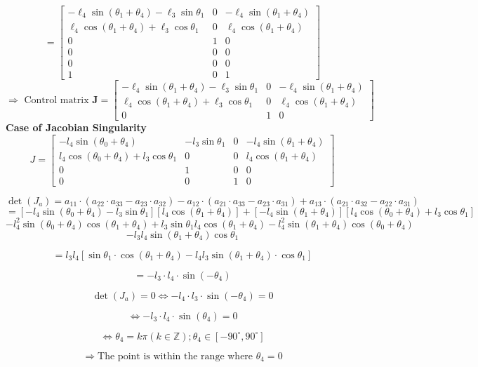 \[
=
\begin{bmatrix}
-\ell_4 \sin(\theta_1 + \theta_4) - \ell_3 \sin\theta_1 & 0 & -\ell_4 \sin(\theta_1 + \theta_4) \\
\ell_4 \cos(\theta_1 + \theta_4) + \ell_3 \cos\theta_1 & 0 & \ell_4 \cos(\theta_1 + \theta_4) \\
0 & 1 & 0 \\
0 & 0 & 0 \\
0 & 0 & 0 \\
1 & 0 & 1
\end{bmatrix}
\]
\[
\Rightarrow \text{ Control matrix } \mathbf{J} = 
\begin{bmatrix}
-\ell_4 \sin(\theta_1 + \theta_4) - \ell_3 \sin \theta_1 & 0 & -\ell_4 \sin(\theta_1 + \theta_4) \\
\ell_4 \cos(\theta_1 + \theta_4) + \ell_3 \cos \theta_1 & 0 & \ell_4 \cos(\theta_1 + \theta_4) \\
0 & 1 & 0
\end{bmatrix}
\]
\textbf{Case of Jacobian Singularity}
\[
J = \begin{bmatrix}
-l_4 \sin(\theta_0 + \theta_4) & -l_3 \sin\theta_1 & 0 & -l_4 \sin(\theta_1 + \theta_4) \\
l_4 \cos(\theta_0 + \theta_4) + l_3 \cos\theta_1 & 0 & 0 & l_4 \cos(\theta_1 + \theta_4) \\
0 & 1 & 0 & 0 \\
0 & 0 & 1 & 0
\end{bmatrix}
\]

\[
\det(J_a) = a_{11} \cdot (a_{22} \cdot a_{33} - a_{23} \cdot a_{32}) - a_{12} \cdot (a_{21} \cdot a_{33} - a_{23} \cdot a_{31}) + a_{13} \cdot (a_{21} \cdot a_{32} - a_{22} \cdot a_{31})
\]
\[
= [-l_4 \sin(\theta_0 + \theta_4) - l_3 \sin\theta_1][l_4 \cos(\theta_1 + \theta_4)] + [-l_4 \sin(\theta_1 + \theta_4)][l_4 \cos(\theta_0 + \theta_4) + l_3 \cos\theta_1]
\]
\[
-l_4^2 \sin(\theta_0 + \theta_4) \cos(\theta_1 + \theta_4) + l_3 \sin\theta_1 l_4 \cos(\theta_1 + \theta_4) - l_4^2 \sin(\theta_1 + \theta_4)\cos(\theta_0 + \theta_4) 
\]
\[
- l_3 l_4 \sin(\theta_1 + \theta_4)\cos\theta_1
\]

\[
= l_3 l_4 [\sin\theta_1 \cdot \cos(\theta_1 + \theta_4) - l_4 l_3 \sin(\theta_1 + \theta_4) \cdot \cos\theta_1]
\]

\[
= -l_3 \cdot l_4 \cdot \sin(-\theta_4)
\]

\[
\det(J_a) = 0 \iff -l_4 \cdot l_3 \cdot \sin(-\theta_4) = 0
\]

\[
\iff -l_3 \cdot l_4 \cdot \sin(\theta_4) = 0
\]

\[
\iff \theta_4 = k\pi (k \in \mathbb{Z}); \theta_4 \in [-90^\circ, 90^\circ]
\]

\[
\Rightarrow \text{The point is within the range where } \theta_4 = 0
\]